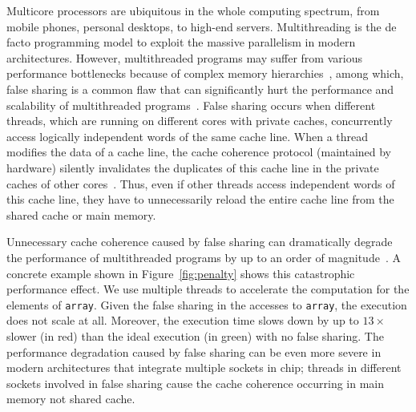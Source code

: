 Multicore processors are ubiquitous in the whole computing spectrum, from mobile phones, personal desktops, to high-end servers. Multithreading is the de facto programming model to exploit the massive parallelism in modern architectures.
However, multithreaded programs may suffer from various performance bottlenecks because of complex memory hierarchies~\cite{ibs-sc,ibs-sc2,Dramon}, among which, false sharing is a common flaw that can significantly hurt the performance and scalability of multithreaded programs~\cite{falseshare:effect}. False sharing occurs when different threads, which are running on different cores with private caches, concurrently access logically independent words of the same cache line. When a thread modifies the data of a cache line, the cache coherence protocol (maintained by hardware) silently invalidates the duplicates of this cache line in the private caches of other cores~\cite{MESI}. Thus, even if other threads access independent words of this cache line, they have to unnecessarily reload the entire cache line from the shared cache or main memory. 

Unnecessary cache coherence caused by false sharing can dramatically degrade the performance of multithreaded programs by up to an order of magnitude~\cite{falseshare:effect}. A concrete example shown in Figure~\ref{fig:penalty} shows this catastrophic performance effect. We use multiple threads to accelerate the computation for the elements of {\tt array}. Given the false sharing in the accesses to {\tt array}, the execution does not scale at all. Moreover, the execution time slows down by up to $13\times$ slower (in red) than the ideal execution (in green) with no false sharing. The performance degradation caused by false sharing can be even more severe in modern architectures that integrate multiple sockets in chip; threads in different sockets involved in false sharing cause the cache coherence occurring in main memory not shared cache.

